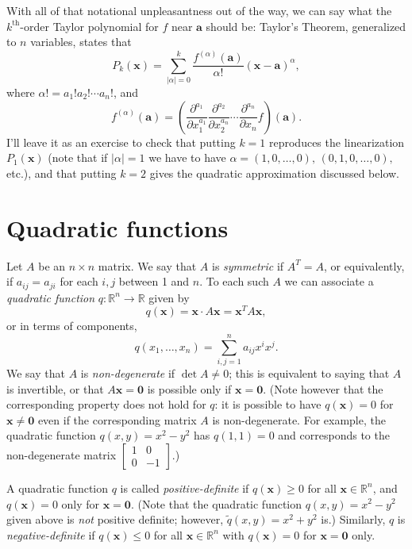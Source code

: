 \documentclass[12pt,letterpaper]{article}
\newcommand{\R}{\mathbb{R}}
\newcommand{\x}{\mathbf{x}}
\renewcommand{\a}{\mathbf{a}}
\newcommand{\abs}[1]{\lvert #1\rvert}
\begin{document}
With all of that notational unpleasantness out of the way, we can say what the $k^{\textrm{th}}$-order Taylor polynomial for $f$ near $\a$ should be: Taylor's Theorem, generalized to $n$ variables, states that 
\[
 P_k(\x) = \sum_{\abs{\alpha}=0}^k \frac{f^{(\alpha)}(\a)}{\alpha!}(\x-\a)^\alpha,
\]
where $\alpha! = a_1!a_2!\cdots a_n!$, and 
\[
f^{(\alpha)}(\a) = \left(\frac{\partial^{a_1}}{\partial x_1^{a_1}}\frac{\partial^{a_2}}{\partial x_2^{a_n}}\cdots\frac{\partial^{a_n}}{\partial x_n}f\right)(\a). 
\]
I'll leave it as an exercise to check that putting $k=1$ reproduces the linearization $P_1(\x)$ (note that if $\abs{\alpha}=1$ we have to have $\alpha = (1,0,\ldots, 0),\, (0,1,0,\ldots, 0),$ etc.), and that putting $k=2$ gives the quadratic approximation discussed below.

\section{Quadratic functions}
Let $A$ be an $n\times n$ matrix. We say that $A$ is {\em symmetric} if $A^T=A$, or equivalently, if $a_{ij} = a_{ji}$ for each $i,j$ between 1 and $n$. To each such $A$ we can associate a {\em quadratic function} $q:\R^n\to \R$ given by
\[
q(\x) = \x\cdot A\x = \x^TA\x,
\]
or in terms of components,
\[
q(x_1,\ldots, x_n) = \sum_{i,j=1}^n a_{ij}x^ix^j.
\]
We say that $A$ is {\em non-degenerate} if $\det A\neq 0$; this is equivalent to saying that $A$ is invertible, or that $A\x=\mathbf{0}$ is possible only if $\x=\mathbf{0}$. (Note however that the corresponding property does not hold for $q$: it is possible to have $q(\x)=0$ for $\x\neq \mathbf{0}$ even if the corresponding matrix $A$ is non-degenerate. For example, the quadratic function $q(x,y)=x^2-y^2$ has $q(1,1)=0$ and corresponds to the non-degenerate matrix $\begin{bmatrix}1&0\\0&-1\end{bmatrix}$.)

A quadratic function $q$ is called {\em positive-definite} if $q(\x)\geq 0$ for all $\x\in\R^n$, and $q(\x)=0$ only for $\x=\mathbf{0}$. (Note that the quadratic function $q(x,y)=x^2-y^2$ given above is {\em not} positive definite; however, $\tilde{q}(x,y) = x^2+y^2$ is.) Similarly, $q$ is {\em negative-definite} if $q(\x)\leq 0$ for all $\x\in\R^n$ with $q(\x)=0$ for $\x=\mathbf{0}$ only.
\end{document}
